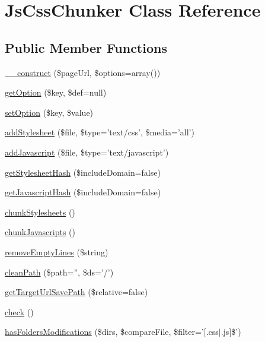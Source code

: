\hypertarget{class_js_css_chunker}{
\section{JsCssChunker Class Reference}
\label{class_js_css_chunker}
}
\subsection*{Public Member Functions}
\begin{DoxyCompactItemize}
\item 
\hyperlink{class_js_css_chunker_ac086f7147441cc8347f8a760eb770101}{\_\-\_\-construct} (\$pageUrl, \$options=array())
\item 
\hyperlink{class_js_css_chunker_acb96f17aa6285ea00daff20ca5f1c93c}{getOption} (\$key, \$def=null)
\item 
\hyperlink{class_js_css_chunker_a929e8f404dc73d92009451a5ed013002}{setOption} (\$key, \$value)
\item 
\hyperlink{class_js_css_chunker_aa9295fea2a4cdc642f94381f251c9f16}{addStylesheet} (\$file, \$type='text/css', \$media='all')
\item 
\hyperlink{class_js_css_chunker_a7c61cd4a535f6ef8a2ac604053bec5ca}{addJavascript} (\$file, \$type='text/javascript')
\item 
\hyperlink{class_js_css_chunker_a29604beec796d425a475bddb9ff82c5b}{getStylesheetHash} (\$includeDomain=false)
\item 
\hyperlink{class_js_css_chunker_ae81263b37e30c07c080446d676c88217}{getJavascriptHash} (\$includeDomain=false)
\item 
\hyperlink{class_js_css_chunker_ad63514de6e0414ed0bd104b40027ff8b}{chunkStylesheets} ()
\item 
\hyperlink{class_js_css_chunker_a14d41458a27cb28c3b7e0f46a55778ef}{chunkJavascripts} ()
\item 
\hyperlink{class_js_css_chunker_a976dec9e25715c7d8771c1ad4968d3fe}{removeEmptyLines} (\$string)
\item 
\hyperlink{class_js_css_chunker_a9a4e27841f563dbd1f8a77e583a2df1c}{cleanPath} (\$path='', \$ds='/')
\item 
\hyperlink{class_js_css_chunker_a701582531b3978f3ba661244b9a481db}{getTargetUrlSavePath} (\$relative=false)
\item 
\hyperlink{class_js_css_chunker_a5fb1933974ac9aae8c7ac4d3344caca6}{check} ()
\item 
\hyperlink{class_js_css_chunker_a7f9d5a7305a6eacc06d6efe724193186}{hasFoldersModifications} (\$dirs, \$compareFile, \$filter='\mbox{[}.css$|$.js\mbox{]}\$')

\end{DoxyCompactItemize}
